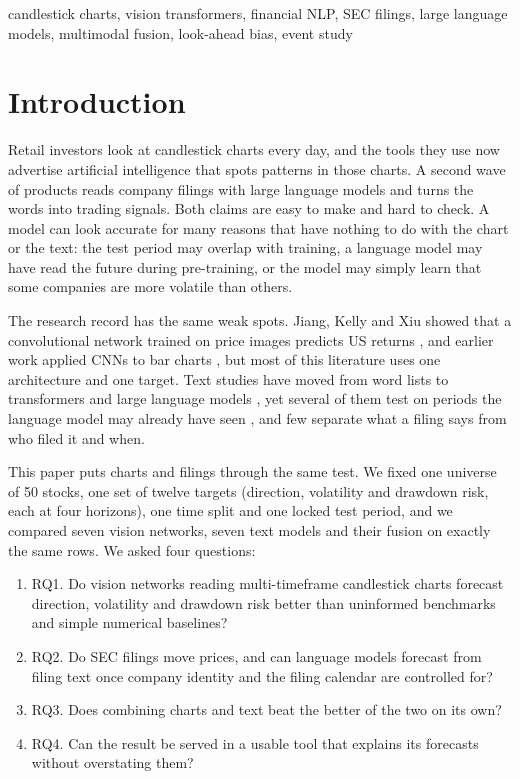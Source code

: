 \documentclass[conference]{IEEEtran}
\begin{document}
\begin{IEEEkeywords}
candlestick charts, vision transformers, financial NLP, SEC filings, large language models, multimodal fusion, look-ahead bias, event study
\end{IEEEkeywords}

\section{Introduction}

Retail investors look at candlestick charts every day, and the tools they use now advertise artificial intelligence that spots patterns in those charts. A second wave of products reads company filings with large language models and turns the words into trading signals. Both claims are easy to make and hard to check. A model can look accurate for many reasons that have nothing to do with the chart or the text: the test period may overlap with training, a language model may have read the future during pre-training, or the model may simply learn that some companies are more volatile than others.

The research record has the same weak spots. Jiang, Kelly and Xiu showed that a convolutional network trained on price images predicts US returns \cite{jkx2023}, and earlier work applied CNNs to bar charts \cite{sezer2019}, but most of this literature uses one architecture and one target. Text studies have moved from word lists \cite{tetlock2007,loughran2011} to transformers \cite{araci2019,huang2023finbert} and large language models \cite{lopezlira2023}, yet several of them test on periods the language model may already have seen \cite{glasserman2023,sarkar2024}, and few separate what a filing says from who filed it and when.

This paper puts charts and filings through the same test. We fixed one universe of 50 stocks, one set of twelve targets (direction, volatility and drawdown risk, each at four horizons), one time split and one locked test period, and we compared seven vision networks, seven text models and their fusion on exactly the same rows. We asked four questions:

\begin{enumerate}
\item RQ1. Do vision networks reading multi-timeframe candlestick charts forecast direction, volatility and drawdown risk better than uninformed benchmarks and simple numerical baselines?
\item RQ2. Do SEC filings move prices, and can language models forecast from filing text once company identity and the filing calendar are controlled for?
\item RQ3. Does combining charts and text beat the better of the two on its own?
\item RQ4. Can the result be served in a usable tool that explains its forecasts without overstating them?
\end{enumerate}
\end{document}
